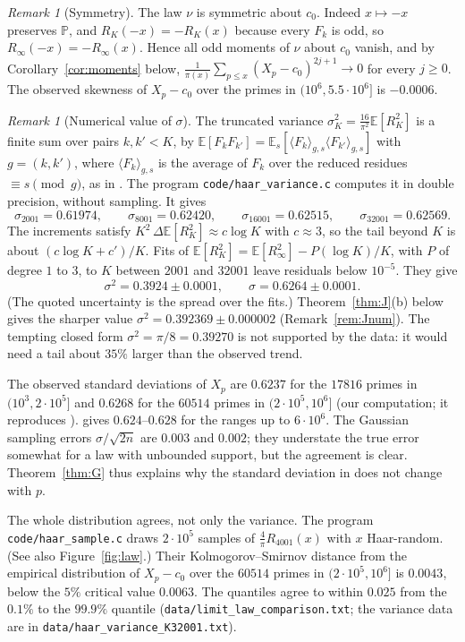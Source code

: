 \documentclass[11pt]{amsart}
\theoremstyle{remark}
\newtheorem{remark}[lemma]{Remark}
\newcommand{\E}{\mathbb{E}}
\newcommand{\Prob}{\mathbb{P}}
\begin{document}
\begin{remark}[Symmetry]
The law $\nu$ is symmetric about $c_0$. Indeed $x\mapsto-x$ preserves $\Prob$, and $R_K(-x)=-R_K(x)$ because every $F_k$ is odd, so $R_\infty(-x)=-R_\infty(x)$. Hence all odd moments of $\nu$ about $c_0$ vanish, and by Corollary~\ref{cor:moments} below, $\frac1{\pi(x)}\sum_{p\le x}(X_p-c_0)^{2j+1}\to0$ for every $j\ge0$. The observed skewness of $X_p-c_0$ over the primes in $(10^6,5.5\cdot10^6]$ is $-0.0006$.
\end{remark}

\begin{remark}[Numerical value of $\sigma$]
The truncated variance $\sigma_K^2=\frac{16}{\pi^2}\E[R_K^2]$ is a finite sum over pairs $k,k'<K$, by $\E[F_kF_{k'}]=\E_s[\langle F_k\rangle_{g,s}\langle F_{k'}\rangle_{g,s}]$ with $g=(k,k')$, where $\langle F_k\rangle_{g,s}$ is the average of $F_k$ over the reduced residues $\equiv s\pmod g$, as in \cite[Theorem~F]{TS}. The program \texttt{code/haar\_variance.c} computes it in double precision, without sampling. It gives
\[
\sigma_{2001}=0.61974,\qquad \sigma_{8001}=0.62420,\qquad \sigma_{16001}=0.62515,\qquad \sigma_{32001}=0.62569 .
\]
The increments satisfy $K^2\,\Delta\E[R_K^2]\approx c\log K$ with $c\approx3$, so the tail beyond $K$ is about $(c\log K+c')/K$. Fits of $\E[R_K^2]=\E[R_\infty^2]-P(\log K)/K$, with $P$ of degree $1$ to $3$, to $K$ between $2001$ and $32001$ leave residuals below $10^{-5}$. They give
\[
\sigma^2=0.3924\pm0.0001,\qquad\sigma=0.6264\pm0.0001 .
\]
(The quoted uncertainty is the spread over the fits.) Theorem~\ref{thm:J}(b) below gives the sharper value $\sigma^2=0.392369\pm0.000002$ (Remark~\ref{rem:Jnum}). The tempting closed form $\sigma^2=\pi/8=0.39270$ is not supported by the data: it would need a tail about $35\%$ larger than the observed trend.

The observed standard deviations of $X_p$ are $0.6237$ for the $17816$ primes in $(10^3,2\cdot10^5]$ and $0.6268$ for the $60514$ primes in $(2\cdot10^5,10^6]$ (our computation; it reproduces \cite[Table~3]{TS}). \cite[Table~3]{TS} gives $0.624$--$0.628$ for the ranges up to $6\cdot10^6$. The Gaussian sampling errors $\sigma/\sqrt{2n}$ are $0.003$ and $0.002$; they understate the true error somewhat for a law with unbounded support, but the agreement is clear. Theorem~\ref{thm:G} thus explains why the standard deviation in \cite[Table~3]{TS} does not change with $p$.

The whole distribution agrees, not only the variance. The program \texttt{code/haar\_sample.c} draws $2\cdot10^5$ samples of $\frac4\pi R_{4001}(x)$ with $x$ Haar-random. (See also Figure~\ref{fig:law}.) Their Kolmogorov--Smirnov distance from the empirical distribution of $X_p-c_0$ over the $60514$ primes in $(2\cdot10^5,10^6]$ is $0.0043$, below the $5\%$ critical value $0.0063$. The quantiles agree to within $0.025$ from the $0.1\%$ to the $99.9\%$ quantile (\texttt{data/limit\_law\_comparison.txt}; the variance data are in \texttt{data/haar\_variance\_K32001.txt}).
\end{remark}
\end{document}
